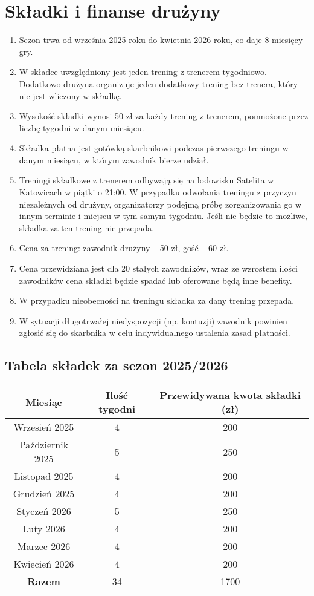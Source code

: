 \documentclass[12pt,a4paper]{article}
\let\stdsection\section
\renewcommand\section{\clearpage\stdsection}
\begin{document}
\section{Składki i finanse drużyny}
\begin{enumerate}
  \item Sezon trwa od września 2025 roku do kwietnia 2026 roku, co daje 8 miesięcy gry.
  \item W składce uwzględniony jest jeden trening z trenerem tygodniowo. Dodatkowo drużyna organizuje jeden dodatkowy trening bez trenera, który nie jest wliczony w składkę.
  \item Wysokość składki wynosi 50 zł za każdy trening z trenerem, pomnożone przez liczbę tygodni w danym miesiącu.
  \item Składka płatna jest gotówką skarbnikowi podczas pierwszego treningu w danym miesiącu, w którym zawodnik bierze udział.
  \item Treningi składkowe z trenerem odbywają się na lodowisku Satelita w Katowicach w piątki o 21:00. W przypadku odwołania treningu z przyczyn niezależnych od drużyny, organizatorzy podejmą próbę zorganizowania go w innym terminie i miejscu w tym samym tygodniu. Jeśli nie będzie to możliwe, składka za ten trening nie przepada.
  \item Cena za trening: zawodnik drużyny -- 50 zł, gość -- 60 zł.
  \item Cena przewidziana jest dla 20 stałych zawodników, wraz ze wzrostem ilości zawodników cena składki będzie spadać lub oferowane będą inne benefity.
  \item W przypadku nieobecności na treningu składka za dany trening przepada.
  \item W sytuacji długotrwałej niedyspozycji (np. kontuzji) zawodnik powinien zgłosić się do skarbnika w celu indywidualnego ustalenia zasad płatności.
\end{enumerate}

\subsection{Tabela składek za sezon 2025/2026}
\begin{center}
\begin{tabular}{ |c|c|c| } 
 \hline
 Miesiąc & Ilość tygodni & Przewidywana kwota składki (zł) \\ 
 \hline
 Wrzesień 2025 & 4 & 200 \\ 
 Październik 2025 & 5 & 250 \\ 
 Listopad 2025 & 4 & 200 \\ 
 Grudzień 2025 & 4 & 200 \\ 
 Styczeń 2026 & 5 & 250 \\ 
 Luty 2026 & 4 & 200 \\ 
 Marzec 2026 & 4 & 200 \\ 
 Kwiecień 2026 & 4 & 200 \\ 
 \hline
 \textbf{Razem} & 34 & 1700 \\ 
 \hline
\end{tabular}
\end{center}
\end{document}

